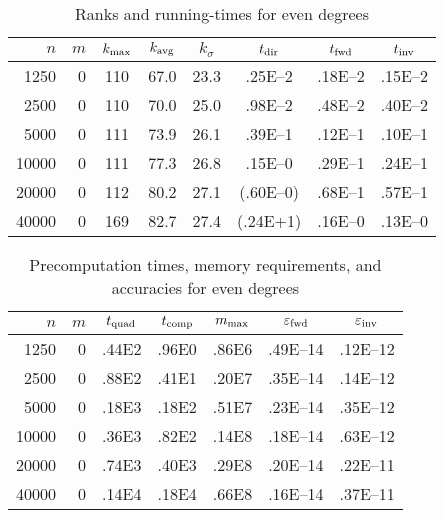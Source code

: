 \documentclass[final,3p,times]{elsarticle}
\def\epsilon{\varepsilon}
\begin{document}
\begin{table}[p]
\caption{Ranks and running-times for even degrees}
\label{small_time}
\vspace{1em}
\begin{tabular*}{\columnwidth}{@{\extracolsep{\fill}}rrcccccc}
$n$ &   $m$ & $k_{\rm max}$ & $k_{\rm avg}$ & $k_{\sigma}$ & $t_{\rm dir}$ & $t_{\rm fwd}$ & $t_{\rm inv}$ \\\hline
 1250 &     0 &           110 &          67.0 &         23.3 &       .25E--2 &       .18E--2 &       .15E--2 \\\hline
 2500 &     0 &           110 &          70.0 &         25.0 &       .98E--2 &       .48E--2 &       .40E--2 \\\hline
 5000 &     0 &           111 &          73.9 &         26.1 &       .39E--1 &       .12E--1 &       .10E--1 \\\hline
10000 &     0 &           111 &          77.3 &         26.8 &       .15E--0 &       .29E--1 &       .24E--1 \\\hline
20000 &     0 &           112 &          80.2 &         27.1 &      (.60E--0)&       .68E--1 &       .57E--1 \\\hline
40000 &     0 &           169 &          82.7 &         27.4 &       (.24E+1)&       .16E--0 &       .13E--0 \\\hline
\end{tabular*}
\end{table}


\begin{table}[p]
\caption{Precomputation times, memory requirements, and accuracies
         for even degrees}
\label{small_pre}
\vspace{1em}
\begin{tabular*}{\columnwidth}{@{\extracolsep{\fill}}rrccccc}
$n$ &   $m$ & $t_{\rm quad}$ & $t_{\rm comp}$ & $m_{\rm max}$ & $\epsilon_{\rm fwd}$ & $\epsilon_{\rm inv}$ \\\hline
 1250 &     0 &          .44E2 &          .96E0 &         .86E6 &             .49E--14 &             .12E--12 \\\hline
 2500 &     0 &          .88E2 &          .41E1 &         .20E7 &             .35E--14 &             .14E--12 \\\hline
 5000 &     0 &          .18E3 &          .18E2 &         .51E7 &             .23E--14 &             .35E--12 \\\hline
10000 &     0 &          .36E3 &          .82E2 &         .14E8 &             .18E--14 &             .63E--12 \\\hline
20000 &     0 &          .74E3 &          .40E3 &         .29E8 &             .20E--14 &             .22E--11 \\\hline
40000 &     0 &          .14E4 &          .18E4 &         .66E8 &             .16E--14 &             .37E--11 \\\hline
\end{tabular*}
\end{table}
\end{document}
